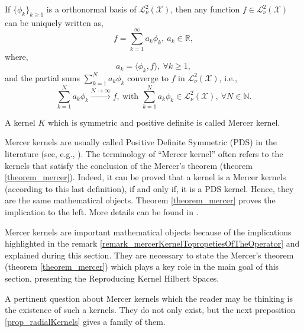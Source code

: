 \begin{remark} \label{remark_orthonormalBasis} 
  If $\{ \phi_k \}_{k \geq 1}$ is a orthonormal basis of $\mathcal{L}^2_{\nu}(\mathcal{X})$, then any function $f \in \mathcal{L}^2_{\nu}(\mathcal{X})$ can be uniquely written as,
  \begin{equation*}
    f = \sum_{k=1}^{\infty} a_k \phi_k, \ a_k \in \mathbb{R}, 
  \end{equation*}
  where,
  \begin{equation*}
    a_k = \langle \phi_k , f \rangle, \ \forall k \geq 1, 
  \end{equation*}
  and the partial sums $\sum_{k=1}^{N} a_k \phi_k$ converge to $f$ in $\mathcal{L}^2_{\nu}(\mathcal{X})$, i.e.,
  \begin{equation} \label{eq_partialSumsConvergeTOf}
    \sum_{k=1}^{N} a_k \phi_k \xrightarrow{N \to \infty} f, \ \text{with } \sum_{k=1}^{N} a_k \phi_k \in \mathcal{L}^2_{\nu}(\mathcal{X}), \ \forall N \in \mathbb{N}.  
  \end{equation}
\end{remark}

\begin{definition} \label{def_mercerKernel}
  A kernel $K$ which is symmetric and positive definite is called Mercer kernel. 
\end{definition}

\begin{remark} \label{remark_PDSkernel}
  Mercer kernels are usually called Positive Definite Symmetric (PDS) in the literature (see, e.g., \textcite{mohri2018}). The terminology of ``Mercer kernel'' often refers to the kernels that satisfy the conclusion of the Mercer's theorem (theorem \ref{theorem_mercer}). Indeed, it can be proved that a kernel is a Mercer kernels (according to this last definition), if and only if, it is a PDS kernel. Hence, they are the same mathematical objects. Theorem \ref{theorem_mercer} proves the implication to the left. More details can be found in \textcite{mohri2018}.
\end{remark}

Mercer kernels are important mathematical objects because of the implications highlighted in the remark \ref{remark_mercerKernelTopropetiesOfTheOperator} and explained during this section. They are necessary to state the Mercer's theorem (theorem \ref{theorem_mercer}) which plays a key role in the main goal of this section, presenting the Reproducing Kernel Hilbert Spaces.

\begin{remark} 
  A pertinent question about Mercer kernels which the reader may be thinking is the existence of such a kernels. They do not only exist, but the next preposition \ref{prop_radialKernels} gives a family of them.
\end{remark}

